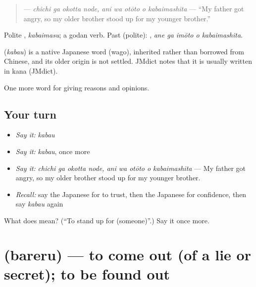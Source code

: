 \begin{quote}
\textbf{   } — \emph{chichi ga okotta node, ani wa otōto o kabaimashita} — \textquotedblleft{}My father got angry, so my older brother stood up for my younger brother.\textquotedblright{}
\end{quote}

Polite \textbf{}, \emph{kabaimasu}; a godan verb. Past (polite): \textbf{  }, \emph{ane ga imōto o kabaimashita}.

\begin{cousinweb}
\textbf{} (\emph{kabau}) is a native Japanese word (wago), inherited rather than borrowed from Chinese, and its older origin is not settled. JMdict notes that it is usually written in kana (JMdict).
\end{cousinweb}

\begin{grammarlens}[title={What you've built}]
One more word for giving reasons and opinions.
\end{grammarlens}

\subsection*{Your turn}
\begin{itemize}
\raggedright
  \item \emph{Say it:} \emph{kabau}
  \item \emph{Say it:} \emph{kabau}, once more
  \item \emph{Say it:} \emph{chichi ga okotta node, ani wa otōto o kabaimashita} — My father got angry, so my older brother stood up for my younger brother.
  \item \emph{Recall:} say the Japanese for to trust, then the Japanese for confidence, then say \emph{kabau} again
\end{itemize}

\begin{tcolorbox}[breakable,colback=teal!4,colframe=teal!35!black,title={Before you move on}]
What does  mean? (\textquotedblleft{}To stand up for (someone)\textquotedblright{}.) Say it once more.
\end{tcolorbox}
\section[\texorpdfstring{\ja{ばれる} (bareru)}{ばれる (bareru)}]{ (bareru) — to come out (of a lie or secret); to be found out}

